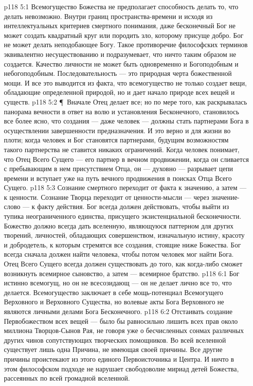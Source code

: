\vs p118 5:1 Всемогущество Божества не предполагает способность делать то, что делать невозможно. Внутри границ пространства\hyp{}времени и исходя из интеллектуальных критериев смертного понимания, даже бесконечный Бог не может создать квадратный круг или породить зло, которому присуще добро. Бог не может делать неподобающее Богу. Такое противоречие философских терминов эквивалентно несуществованию и подразумевает, что ничто таким образом не создается. Качество личности не может быть одновременно и Богоподобным и небогоподобным. Последовательность --- это природная черта божественной мощи. И все это выводится из факта, что всемогущество не только создает вещи, обладающие определенной природой, но и дает начало природе всех вещей и существ.
\vs p118 5:2 \P\ Вначале Отец делает все; но по мере того, как раскрывалась панорама вечности в ответ на волю и установления Бесконечного, становилось все более ясно, что создания --- даже человек --- должны стать партнерами Бога в осуществлении завершенности предназначения. И это верно и для жизни во плоти; когда человек и Бог становятся партнерами, будущим возможностям такого партнерства не ставится никаких ограничений. Когда человек понимает, что Отец Всего Сущего --- его партнер в вечном продвижении, когда он сливается с пребывающим в нем присутствием Отца, он --- духовно --- разрывает цепи времени и вступает уже на путь вечного продвижения в поисках Отца Всего Сущего.
\vs p118 5:3 Сознание смертного переходит от факта к значению, а затем --- к ценности. Сознание Творца переходит от ценности\hyp{}мысли --- через значение\hyp{}слово --- к факту действия. Бог всегда должен действовать, чтобы выйти из тупика неограниченного единства, присущего экзистенциальной бесконечности. Божество должно всегда дать вселенную, являющуюся паттерном для других творений, личностей, обладающих совершенством, изначальную истину, красоту и добродетель, к которым стремятся все создания, стоящие ниже Божества. Бог всегда сначала должен найти человека, чтобы потом человек мог найти Бога. Отец Всего Сущего всегда должен существовать до того, как когда\hyp{}либо сможет возникнуть всемирное сыновство, а затем --- всемирное братство.
\vs p118 6:1 Бог истинно всемогущ, но он не всесозидающ --- он не делает лично все то, что делается. Всемогущество заключает в себе мощь\hyp{}потенциал Всемогущего Верховного и Верховного Существа, но волевые акты Бога Верховного не являются личными делами Бога Бесконечного.
\vs p118 6:2 Отстаивать создание Первобожеством всех вещей --- было бы равносильно лишить всех прав около миллиона Творцов\hyp{}Сынов Рая, не говоря уже о бесчисленных сонмах различных других чинов сопутствующих творческих помощников. Во всей вселенной существует лишь одна Причина, не имеющая своей причины. Все другие причины проистекают из этого единого Первоисточника и Центра. И ничто в этом философском подходе не нарушает свободоволие мириад детей Божества, рассеянных по всей громадной вселенной.
